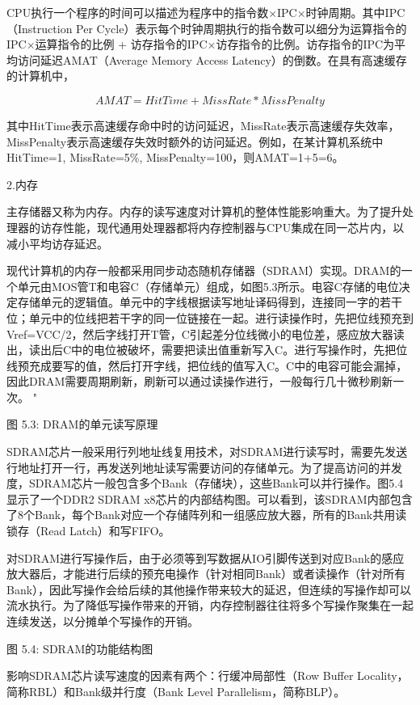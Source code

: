 \documentclass[]{ctexbook}
\begin{document}
CPU执行一个程序的时间可以描述为程序中的指令数×IPC×时钟周期。其中IPC（Instruction Per Cycle）表示每个时钟周期执行的指令数可以细分为运算指令的IPC×运算指令的比例 + 访存指令的IPC×访存指令的比例。访存指令的IPC为平均访问延迟AMAT（Average Memory Access Latency）的倒数。在具有高速缓存的计算机中，

\[AMAT = HitTime + MissRate * MissPenalty\]

其中HitTime表示高速缓存命中时的访问延迟，MissRate表示高速缓存失效率，MissPenalty表示高速缓存失效时额外的访问延迟。例如，在某计算机系统中HitTime=1, MissRate=5\%, MissPenalty=100，则AMAT=1+5=6。

2.内存

主存储器又称为内存。内存的读写速度对计算机的整体性能影响重大。为了提升处理器的访存性能，现代通用处理器都将内存控制器与CPU集成在同一芯片内，以减小平均访存延迟。

现代计算机的内存一般都采用同步动态随机存储器（SDRAM）实现。DRAM的一个单元由MOS管T和电容C（存储单元）组成，如图5.3所示。电容C存储的电位决定存储单元的逻辑值。单元中的字线根据读写地址译码得到，连接同一字的若干位；单元中的位线把若干字的同一位链接在一起。进行读操作时，先把位线预充到Vref=VCC/2，然后字线打开T管，C引起差分位线微小的电位差，感应放大器读出，读出后C中的电位被破坏，需要把读出值重新写入C。进行写操作时，先把位线预充成要写的值，然后打开字线，把位线的值写入C。C中的电容可能会漏掉，因此DRAM需要周期刷新，刷新可以通过读操作进行，一般每行几十微秒刷新一次。
"

图 5.3: DRAM的单元读写原理

SDRAM芯片一般采用行列地址线复用技术，对SDRAM进行读写时，需要先发送行地址打开一行，再发送列地址读写需要访问的存储单元。为了提高访问的并发度，SDRAM芯片一般包含多个Bank（存储块），这些Bank可以并行操作。图5.4显示了一个DDR2 SDRAM x8芯片的内部结构图。可以看到，该SDRAM内部包含了8个Bank，每个Bank对应一个存储阵列和一组感应放大器，所有的Bank共用读锁存（Read Latch）和写FIFO。

对SDRAM进行写操作后，由于必须等到写数据从IO引脚传送到对应Bank的感应放大器后，才能进行后续的预充电操作（针对相同Bank）或者读操作（针对所有Bank），因此写操作会给后续的其他操作带来较大的延迟，但连续的写操作却可以流水执行。为了降低写操作带来的开销，内存控制器往往将多个写操作聚集在一起连续发送，以分摊单个写操作的开销。

图 5.4: SDRAM的功能结构图

影响SDRAM芯片读写速度的因素有两个：行缓冲局部性（Row Buffer Locality，简称RBL）和Bank级并行度（Bank Level Parallelism，简称BLP）。
\end{document}
